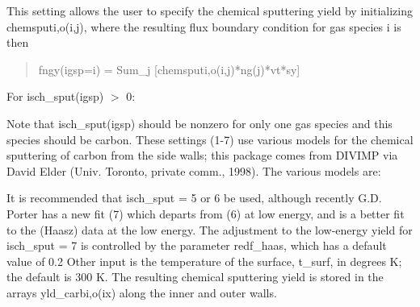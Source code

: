 \documentclass [12pt]{article}
\def\hsa{\hskip.4truein}
\def\hsp6{\hskip.6truein}
\begin{document}
This setting allows the user to specify the chemical sputtering yield by
initializing {\sf chemsputi,o(i,j)}, where the resulting flux boundary
condition for gas species i is then

\begin{verse} \sf
        fngy(igsp=i) = Sum\_j [chemsputi,o(i,j)*ng(j)*vt*sy]
\end{verse}
\noindent
For {\sf isch\_sput(igsp)} $>$ 0: 

Note that {\sf isch\_sput(igsp)} should be nonzero for only one gas species
and this species should be carbon.  These settings (1-7) use various models
for the chemical sputtering of carbon from the side walls; this package comes
from DIVIMP via David Elder (Univ. Toronto, private comm., 1998).  The various
models are: {\sf
{}
} It is recommended that {\sf isch\_sput} = 5 or 6 be used, although recently
G.D. Porter has a new fit (7) which departs from (6) at low energy, and is a
better fit to the (Haasz) data at the low energy.  The adjustment to the
low-energy yield for {\sf isch\_sput} = 7 is controlled by the parameter {\sf
  redf\_haas}, which has a default value of 0.2 Other input is the temperature
of the surface, t\_surf, in degrees K; the default is 300 K.  The resulting
chemical sputtering yield is stored in the arrays yld\_carbi,o(ix) along the
inner and outer walls.
\end{document}
